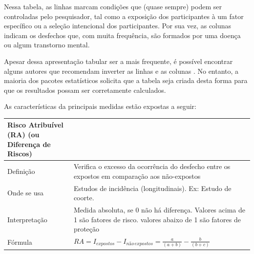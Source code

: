 \documentclass[
]{book}
\begin{document}
Nessa tabela, as linhas marcam condições que (quase sempre) podem ser controladas pelo pesquisador, tal como a exposição dos participantes à um fator específico ou a seleção intencional dos participantes. Por sua vez, as colunas indicam os desfechos que, com muita frequência, são formados por uma doença ou algum transtorno mental.

Apesar dessa apresentação tabular ser a mais frequente, é possível encontrar alguns autores que recomendam inverter as linhas e as colunas \citep{Schoenbach2000}. No entanto, a maioria dos pacotes estatísticos solicita que a tabela seja criada desta forma para que os resultados possam ser corretamente calculados.

As características da principais medidas estão expostas a seguir:

\begin{longtable}[]{@{}ll@{}}
\toprule
\begin{minipage}[b]{0.22\columnwidth}\raggedright
Risco Atribuível (RA) (ou Diferença de Riscos)\strut
\end{minipage} & \begin{minipage}[b]{0.72\columnwidth}\raggedright
\strut
\end{minipage}\tabularnewline
\midrule
\endhead
\begin{minipage}[t]{0.22\columnwidth}\raggedright
Definição\strut
\end{minipage} & \begin{minipage}[t]{0.72\columnwidth}\raggedright
Verifica o excesso da ocorrência do desfecho entre os expostos em comparação aos não-expostos\strut
\end{minipage}\tabularnewline
\begin{minipage}[t]{0.22\columnwidth}\raggedright
Onde se usa\strut
\end{minipage} & \begin{minipage}[t]{0.72\columnwidth}\raggedright
Estudos de incidência (longitudinais). Ex: Estudo de coorte.\strut
\end{minipage}\tabularnewline
\begin{minipage}[t]{0.22\columnwidth}\raggedright
Interpretação\strut
\end{minipage} & \begin{minipage}[t]{0.72\columnwidth}\raggedright
Medida absoluta, se 0 não há diferença. Valores acima de 1 são fatores de risco. valores abaixo de 1 são fatores de proteção\strut
\end{minipage}\tabularnewline
\begin{minipage}[t]{0.22\columnwidth}\raggedright
Fórmula\strut
\end{minipage} & \begin{minipage}[t]{0.72\columnwidth}\raggedright
\(RA = I_{expostos}-I_{não \, expostos} = \frac{a}{(a+b)}-\frac{b}{(b+c)}\)\strut
\end{minipage}\tabularnewline
\bottomrule
\end{longtable}
\end{document}
